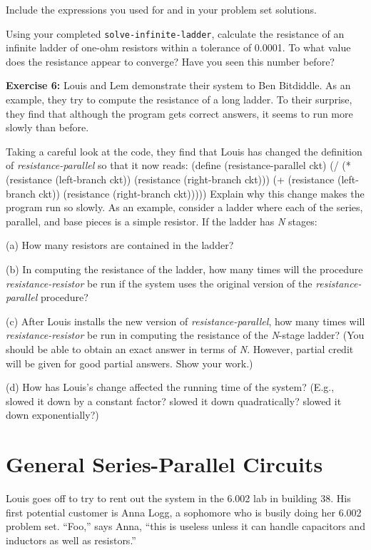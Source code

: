 Include the expressions you used for {\tt <exp1>} and {\tt <exp2>} in your
problem set solutions.

Using your completed {\tt solve-infinite-ladder}, calculate the resistance of
an infinite ladder of one-ohm resistors within a tolerance of 0.0001.  To what
value does the resistance appear to converge?  Have you seen this number
before?

{\bf Exercise 6:}
Louis and Lem demonstrate their system to Ben Bitdiddle.  As an
example, they try to compute the resistance of a long ladder.  To
their surprise, they find that although the program gets correct
answers, it seems to run more slowly than before.

Taking a careful look at the code, they find that Louis has changed
the definition of {\it resistance-parallel} so that it now reads:
\beginlisp
(define (resistance-parallel ckt)
  (/ (* (resistance (left-branch ckt))
        (resistance (right-branch ckt)))
     (+ (resistance (left-branch ckt))
        (resistance (right-branch ckt)))))
\endlisp
Explain why this change makes the program run so slowly.  As an
example, consider a ladder where each of the series, parallel, and
base pieces is a simple resistor.  If the ladder has {\it N} stages:

(a) How many resistors are contained in the ladder?

(b) In computing the resistance of the ladder, how many times will the
procedure {\it resistance-resistor} be run if the system uses the
original version of the {\it resistance-parallel} procedure?

(c) After Louis installs the new version of {\it resistance-parallel}, how
many times will {\it resistance-resistor} be run in computing the resistance
of the {\it N}-stage ladder?  (You should be able to obtain an exact answer
in terms of {\it N}.  However, partial credit will be given for good partial
answers.  Show your work.)

(d) How has Louis's change affected the running time of the system?
(E.g., slowed it down by a constant factor?  slowed it down
quadratically? slowed it down exponentially?)


\section{General Series-Parallel Circuits}

Louis goes off to try to rent out the system in the 6.002 lab in
building 38.  His first potential customer is Anna Logg, a sophomore
who is busily doing her 6.002 problem set.  ``Foo,'' says Anna, ``this
is useless unless it can handle capacitors and inductors as well as
resistors.''

